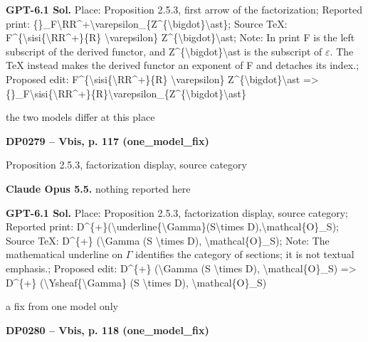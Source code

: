 \textbf{GPT-6.1 Sol.} Place: Proposition 2.5.3, first arrow of the factorization; Reported print: \{\}\_F\textbackslash{}RR\textasciicircum{}+\textbackslash{}varepsilon\_\{Z\textasciicircum{}\{\textbackslash{}bigdot\}\textbackslash{}ast\}; Source TeX: F\textasciicircum{}\{\textbackslash{}sisi\{\textbackslash{}RR\textasciicircum{}+\}\{R\} \textbackslash{}varepsilon\} Z\textasciicircum{}\{\textbackslash{}bigdot\}\textbackslash{}ast; Note: In print F is the left subscript of the derived functor, and Z\textasciicircum{}\{\textbackslash{}bigdot\}\textbackslash{}ast is the subscript of \ensuremath{\varepsilon}. The TeX instead makes the derived functor an exponent of F and detaches its index.; Proposed edit: F\textasciicircum{}\{\textbackslash{}sisi\{\textbackslash{}RR\textasciicircum{}+\}\{R\} \textbackslash{}varepsilon\} Z\textasciicircum{}\{\textbackslash{}bigdot\}\textbackslash{}ast =\allowbreak > \{\}\_F\textbackslash{}sisi\{\textbackslash{}RR\textasciicircum{}+\}\{R\}\textbackslash{}varepsilon\_\{Z\textasciicircum{}\{\textbackslash{}bigdot\}\textbackslash{}ast\}\par
the two models differ at this place\par
\par\noindent\hypertarget{DP0279}{}\textbf{DP0279 -- Vbis, p. 117 (one\_model\_fix)}\par
Proposition 2.5.3, factorization display, source category\par
\textbf{Claude Opus 5.5.} nothing reported here\par
\textbf{GPT-6.1 Sol.} Place: Proposition 2.5.3, factorization display, source category; Reported print: D\textasciicircum{}\{+\}(\textbackslash{}underline\{\textbackslash{}Gamma\}(S\textbackslash{}times D),\textbackslash{}mathcal\{O\}\_S); Source TeX: D\textasciicircum{}\{+\} (\textbackslash{}Gamma (S \textbackslash{}times D), \textbackslash{}mathcal\{O\}\_S); Note: The mathematical underline on \ensuremath{\Gamma} identifies the category of sections; it is not textual emphasis.; Proposed edit: D\textasciicircum{}\{+\} (\textbackslash{}Gamma (S \textbackslash{}times D), \textbackslash{}mathcal\{O\}\_S) =\allowbreak > D\textasciicircum{}\{+\} (\textbackslash{}Ysheaf\{\textbackslash{}Gamma\} (S \textbackslash{}times D), \textbackslash{}mathcal\{O\}\_S)\par
a fix from one model only\par
\par\noindent\hypertarget{DP0280}{}\textbf{DP0280 -- Vbis, p. 118 (one\_model\_fix)}\par
